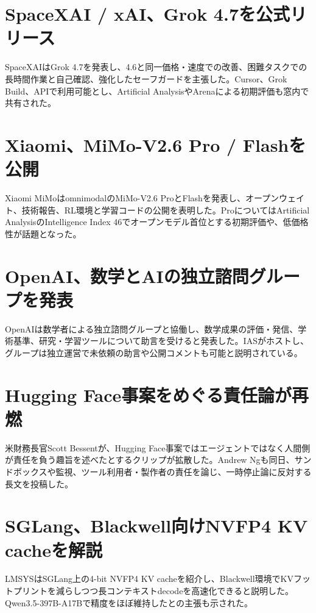 \section{SpaceXAI / xAI、Grok 4.7を公式リリース}
SpaceXAIはGrok 4.7を発表し、4.6と同一価格・速度での改善、困難タスクでの長時間作業と自己確認、強化したセーフガードを主張した。Cursor、Grok Build、APIで利用可能とし、Artificial AnalysisやArenaによる初期評価も窓内で共有された。

\section{Xiaomi、MiMo-V2.6 Pro / Flashを公開}
Xiaomi MiMoはomnimodalのMiMo-V2.6 ProとFlashを発表し、オープンウェイト、技術報告、RL環境と学習コードの公開を表明した。ProについてはArtificial AnalysisのIntelligence Index 46でオープンモデル首位とする初期評価や、低価格性が話題となった。

\section{OpenAI、数学とAIの独立諮問グループを発表}
OpenAIは数学者による独立諮問グループと協働し、数学成果の評価・発信、学術基準、研究・学習ツールについて助言を受けると発表した。IASがホストし、グループは独立運営で未依頼の助言や公開コメントも可能と説明されている。

\section{Hugging Face事案をめぐる責任論が再燃}
米財務長官Scott Bessentが、Hugging Face事案ではエージェントではなく人間側が責任を負う趣旨を述べたとするクリップが拡散した。Andrew Ngも同日、サンドボックスや監視、ツール利用者・製作者の責任を論じ、一時停止論に反対する長文を投稿した。

\section{SGLang、Blackwell向けNVFP4 KV cacheを解説}
LMSYSはSGLang上の4-bit NVFP4 KV cacheを紹介し、Blackwell環境でKVフットプリントを減らしつつ長コンテキストdecodeを高速化できると説明した。Qwen3.5-397B-A17Bで精度をほぼ維持したとの主張も示された。

